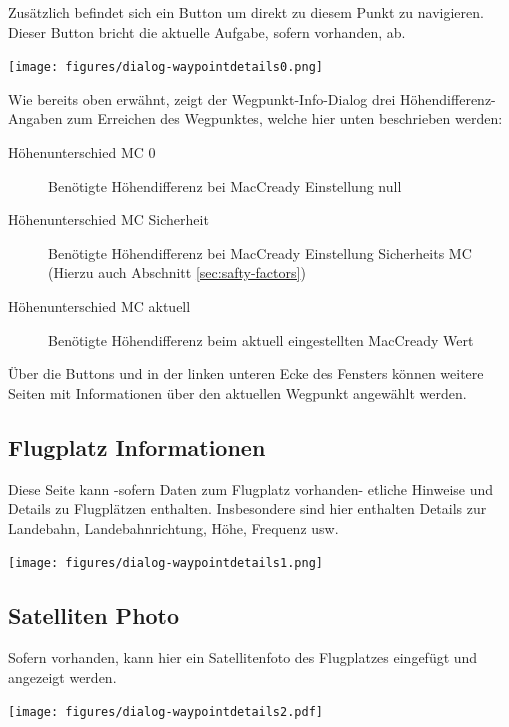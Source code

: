 Zusätzlich befindet sich ein Button  um direkt zu diesem Punkt zu navigieren.  Dieser Button bricht die aktuelle Aufgabe, sofern vorhanden, ab.
\begin{center}
\texttt{[image: figures/dialog-waypointdetails0.png]}
\end{center}

Wie bereits oben erwähnt, zeigt der Wegpunkt-Info-Dialog drei Höhendifferenz-Angaben zum Erreichen des Wegpunktes, welche hier unten beschrieben werden:

\begin{description}
\item[Höhenunterschied MC 0] Benötigte Höhendifferenz bei MacCready Einstellung null
\item[Höhenunterschied MC Sicherheit] Benötigte Höhendifferenz bei MacCready Einstellung Sicherheits MC (Hierzu auch Abschnitt \ref{sec:safty-factors})
\item[Höhenunterschied MC aktuell] Benötigte Höhendifferenz beim  aktuell eingestellten MacCready Wert
\end{description}

Über die Buttons \button{$<$} und \button{$>$} in der linken unteren Ecke des Fensters können weitere Seiten mit Informationen über den aktuellen Wegpunkt angewählt werden.


\subsection*{Flugplatz Informationen}
Diese Seite kann -sofern Daten zum Flugplatz vorhanden- etliche Hinweise und Details zu Flugplätzen enthalten. Insbesondere sind hier enthalten Details zur Landebahn, Landebahnrichtung, Höhe, Frequenz usw.

\begin{center}
\texttt{[image: figures/dialog-waypointdetails1.png]}
\end{center}

\subsection*{Satelliten Photo}
\halt Sofern vorhanden, kann hier ein Satellitenfoto des Flugplatzes eingefügt und angezeigt werden.

\begin{center}
\texttt{[image: figures/dialog-waypointdetails2.pdf]}
\end{center}



